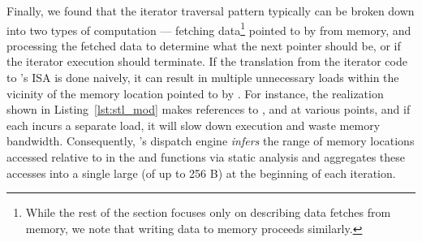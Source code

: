 Finally, we found that the iterator traversal pattern typically can be broken down into two types of computation --- fetching data\footnote{While the rest of the section focuses only on describing data fetches from memory, we note that writing data to memory proceeds similarly.} pointed to by  from memory, and processing the fetched data to determine what the next pointer should be, or if the iterator execution should terminate. If the translation from the iterator code to \pulse's ISA is done naively, it can result in multiple unnecessary loads within the vicinity of the memory location pointed to by . For instance, the  realization shown in Listing~\ref{lst:stl_mod} makes references to ,  and  at various points, and if each incurs a separate load, it will slow down execution and waste memory bandwidth. Consequently, \pulse's dispatch engine \emph{infers} the range of memory locations accessed relative to  in the  and  functions via static analysis and aggregates these accesses into a single large  (of up to 256 B) at the beginning of each iteration. 


